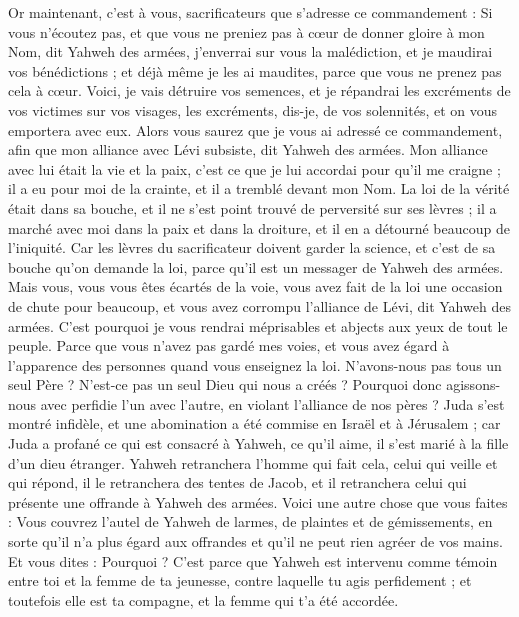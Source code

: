 \begin{multicols}{2}
\VerseOne{}Or maintenant, c'est à vous, sacrificateurs que s'adresse ce commandement :
Si vous n'écoutez pas, et que vous ne preniez pas à cœur de donner gloire à mon Nom, dit Yahweh des armées, j'enverrai sur vous la malédiction, et je maudirai vos bénédictions ; et déjà même je les ai maudites, parce que vous ne prenez pas cela à cœur.
Voici, je vais détruire vos semences, et je répandrai les excréments de vos victimes sur vos visages, les excréments, dis-je, de vos solennités, et on vous emportera avec eux.
Alors vous saurez que je vous ai adressé ce commandement, afin que mon alliance avec Lévi subsiste, dit Yahweh des armées.
Mon alliance avec lui était la vie et la paix, c'est ce que je lui accordai pour qu'il me craigne ; il a eu pour moi de la crainte, et il a tremblé devant mon Nom.
La loi de la vérité était dans sa bouche, et il ne s'est point trouvé de perversité sur ses lèvres ; il a marché avec moi dans la paix et dans la droiture, et il en a détourné beaucoup de l'iniquité.
Car les lèvres du sacrificateur doivent garder la science, et c'est de sa bouche qu'on demande la loi, parce qu'il est un messager de Yahweh des armées.
Mais vous, vous vous êtes écartés de la voie, vous avez fait de la loi une occasion de chute pour beaucoup, et vous avez corrompu l'alliance de Lévi, dit Yahweh des armées.
C'est pourquoi je vous rendrai méprisables et abjects aux yeux de tout le peuple. Parce que vous n'avez pas gardé mes voies, et vous avez égard à l'apparence des personnes quand vous enseignez la loi.
N'avons-nous pas tous un seul Père ? N'est-ce pas un seul Dieu qui nous a créés ? Pourquoi donc agissons-nous avec perfidie l'un avec l'autre, en violant l'alliance de nos pères ?
Juda s'est montré infidèle, et une abomination a été commise en Israël et à Jérusalem ; car Juda a profané ce qui est consacré à Yahweh, ce qu'il aime, il s'est marié à la fille d'un dieu étranger.
Yahweh retranchera l'homme qui fait cela, celui qui veille et qui répond, il le retranchera des tentes de Jacob, et il retranchera celui qui présente une offrande à Yahweh des armées.
Voici une autre chose que vous faites : Vous couvrez l'autel de Yahweh de larmes, de plaintes et de gémissements, en sorte qu'il n'a plus égard aux offrandes et qu'il ne peut rien agréer de vos mains.
Et vous dites : Pourquoi ? C'est parce que Yahweh est intervenu comme témoin entre toi et la femme de ta jeunesse, contre laquelle tu agis perfidement ; et toutefois elle est ta compagne, et la femme qui t'a été accordée.

\end{multicols}

